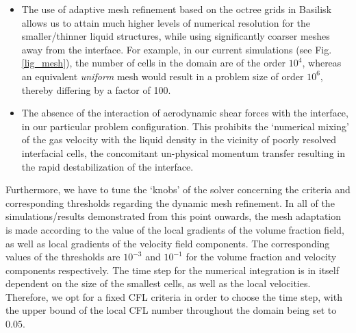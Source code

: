 \begin{itemize}
	\item The use of adaptive mesh refinement based on the octree grids in Basilisk allows 
		us to attain much higher levels of numerical resolution for the smaller/thinner 
		liquid structures, while using significantly coarser meshes away from the interface.
		For example, in our current simulations (see Fig. \ref{lig_mesh}), the number of cells
		in the domain are of the order $10^4$, whereas an equivalent \textit{uniform} mesh 
		would result in a problem size of order $10^6$, thereby differing by a factor of 100.
	\item The absence of the interaction of aerodynamic shear forces with the interface, in our particular
		problem configuration. This prohibits the `numerical mixing' of the gas velocity with the
		liquid density in the vicinity of poorly resolved interfacial cells, the concomitant 
		un-physical momentum transfer resulting in the rapid destabilization of the interface.   
\end{itemize}

Furthermore, we have to tune the `knobs' of the 
solver concerning the criteria and corresponding 
thresholds regarding the dynamic mesh refinement. 
In all of the simulations/results demonstrated 
from this point onwards, the mesh adaptation is 
made according to the value of the local 
gradients of the volume fraction field, 
as well as local gradients of the velocity field components.  
The corresponding values of the thresholds are $10^{-3}$ 
and $10^{-1}$ for the volume fraction and velocity components respectively. 
The time step for the numerical integration is in itself dependent on the 
size of the smallest cells, as well as the local velocities. 
Therefore, we opt for a fixed CFL criteria in order to choose the time step, 
with the upper bound of the local CFL number throughout the domain being set to $0.05$.

